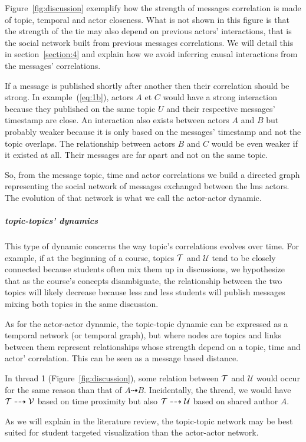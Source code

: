 \documentclass[a4paper,twoside]{article}
\newcommand{\V}{\mathcal{V}}
\newcommand{\U}{\mathcal{U}}
\begin{document}
Figure~\ref{fig:discussion} exemplify how the strength of messages correlation is made of topic, temporal and actor closeness.  What is not shown in this figure is that the strength of the tie may also depend on previous actors' interactions, that is the social network built from previous messages correlations.
We will detail this in section~\ref{section:4} and explain how we avoid inferring causal interactions from the messages' correlations.

If a message is published shortly after another then their correlation should be strong.  In example~(\ref{eq:1b}), actors $A$ et $C$ would have a strong interaction because they published on the same topic $U$ and their respective messages' timestamp are close.  An interaction also exists between actors $A$ and $B$ but probably weaker because it is only based on the messages' timestamp and not the topic overlaps.  The relationship between actors $B$ and $C$ would be even weaker if it existed at all.  Their messages are far apart and not on the same topic. 

So, from the message topic, time and actor correlations we build a directed graph representing the social network of messages exchanged between the \gls{lms} actors. The evolution of that network is what we call the actor-actor dynamic.

\subparagraph{topic-topics' dynamics} This type of dynamic concerns the way topic's correlations evolves over time.  For example, if at the beginning of a course, topics $\mathcal{T}$ and $\U$ tend to be closely connected because students often mix them up in discussions, we hypothesize that as the course's concepts disambiguate, the relationship between the two topics will likely decrease because less and less students will publish messages mixing both topics in the same discussion.

As for the actor-actor dynamic, the topic-topic dynamic can be expressed as a temporal network (or temporal graph), but where nodes are topics and links between them represent relationships whose strength depend on a topic, time and actor' correlation.  This can be seen as a message based distance.

In thread 1 (Figure~\ref{fig:discussion}), some relation between $\mathcal{T}$ and $\U$ would occur for the same reason than that of $A \dashrightarrow B$.  Incidentally, the  thread, we would have $\T  \dashrightarrow \V$ based on time proximity but also $\T \dashrightarrow \U$ based on shared author $A$.

As we will explain in the literature review, the topic-topic network may be best suited for student targeted visualization than the actor-actor network.
\end{document}
